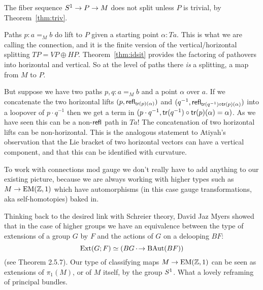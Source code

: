 The fiber sequence \( S^1\to P\to M \) does not split unless \( P \) is trivial, by Theorem~\ref{thm:triv}.

Paths \( p:a=_M b \) do lift to \( P \) given a starting point \( \alpha:Ta \). This is what we are calling the connection, and it is the finite version of the vertical/horizontal splitting \( TP=VP\oplus HP \). Theorem~\ref{thm:idsit} provides the factoring of pathovers into horizontal and vertical. So at the level of paths there \emph{is} a splitting, a map from \( M \) to \( P \).

But suppose we have two paths \( p,q:a=_M b \) and a point \( \alpha \) over \( a \). If we concatenate the two horizontal lifts \( (p,\mathsf{refl}_{\mathsf{tr}(p)(\alpha)}) \) and \( (q^{-1}, \mathsf{refl}_{\mathsf{tr}(q^{-1})\circ\mathsf{tr}(p)(\alpha)}) \) into a loopover of \( p\cdot q^{-1} \) then we get a term in \( (p\cdot q^{-1}, \mathsf{tr}(q^{-1})\circ\mathsf{tr}(p)(\alpha)=\alpha) \). As we have seen this can be a non-\( \mathsf{refl} \) path in \( Ta \)! The concatenation of two horizontal lifts can be non-horizontal. This is the analogous statement to Atiyah's observation that the Lie bracket of two horizontal vectors can have a vertical component, and that this can be identified with curvature.

To work with connections mod gauge we don't really have to add anything to our existing picture, because we are always working with higher types such as \( M\to\mathrm{EM}(\mathbb{Z},1) \) which have automorphisms (in this case gauge transformations, aka self-homotopies) baked in.

Thinking back to the desired link with Schreier theory, David Jaz Myers showed that in the case of higher groups we have an equivalence between the type of extensions of a group \( G \) by \( F \) and the actions of \( G \) on a delooping \( BF \):
\[ 
\mathrm{Ext}(G; F) \simeq (BG \,\cdot\!\to \operatorname{BAut}(BF))
\]
(see \cite{myersthesis} Theorem 2.5.7). Our type of classifying maps \( M\to\mathrm{EM}(\mathbb{Z},1) \) can be seen as extensions of \( \pi_1(M) \), or of \( M \) itself, by the group \( S^1 \). What a lovely reframing of principal bundles.
